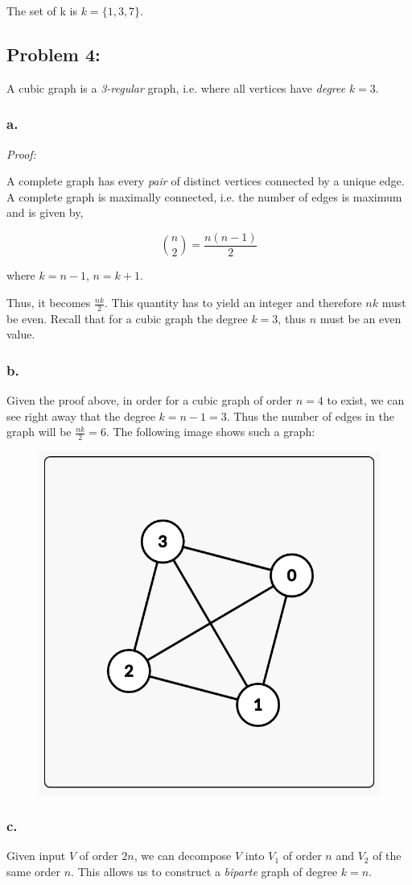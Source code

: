 \documentclass[12pt,letterpaper]{article}
\begin{document}
The set of k is $k = \{1, 3, 7\}$.

\pagebreak
\subsection*{Problem 4:}

A cubic graph is a \emph{3-regular} graph, i.e. where all vertices have
\emph{degree} $k=3$.

\subsubsection*{a.}

\emph{Proof:}

A complete graph has every \emph{pair} of distinct vertices connected by a
unique edge. A complete graph is maximally connected, i.e. the number of edges
is maximum and is given by,

\[ {n \choose 2} = \frac{n(n-1)}{2} \]

where $k=n-1$, $n=k+1$.

Thus, it becomes $\frac{nk}{2}$. This quantity has to yield an integer and
therefore $nk$ must be even. Recall that for a cubic graph the degree $k = 3$,
thus $n$ must be an even value.

\subsubsection*{b.}
Given the proof above, in order for a cubic graph of order $n=4$ to exist, we
can see right away that the degree $k=n-1=3$. Thus the number of edges in the
graph will be $\frac{nk}{2} = 6$. The following image shows such a graph:

\begin{figure}[h]
\includegraphics[scale=0.20]{n4k3}
\centering
\end{figure}

\subsubsection*{c.}
Given input $V$ of order $2n$, we can decompose $V$ into $V_1$ of order $n$
and $V_2$ of the same order $n$.  This allows us to construct a \emph{biparte} graph of degree $k=n$.
\end{document}
